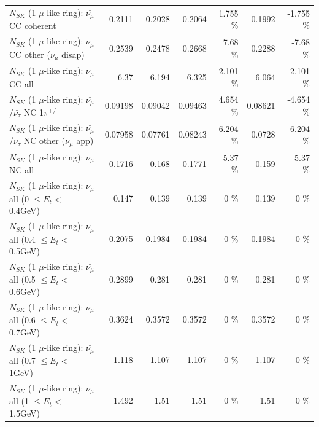 \begin{table}
\begin{tabular}{| l | r | r | r  r | r  r |}
                       $N_{SK}$ (1 $\mu$-like ring): $\bar{\nu_\mu}$ CC coherent &          0.2111 &          0.2028 &          0.2064 &    1.755 \%  &          0.1992 &   -1.755 \%  \\ 
        $N_{SK}$ (1 $\mu$-like ring): $\bar{\nu_\mu}$ CC other ($\nu_\mu$ disap) &          0.2539 &          0.2478 &          0.2668 &     7.68 \%  &          0.2288 &    -7.68 \%  \\ 
                          $N_{SK}$ (1 $\mu$-like ring): $\bar{\nu_{\mu}}$ CC all &            6.37 &           6.194 &           6.325 &    2.101 \%  &           6.064 &   -2.101 \%  \\ 
\hline
  $N_{SK}$ (1 $\mu$-like ring): $\bar{\nu_\mu}$/$\bar{\nu_\tau}$ NC 1$\pi^{+/-}$ &         0.09198 &         0.09042 &         0.09463 &    4.654 \%  &         0.08621 &   -4.654 \%  \\ 
$N_{SK}$ (1 $\mu$-like ring): $\bar{\nu_\mu}$/$\bar{\nu_\tau}$ NC other ($\nu_\mu$ app) &         0.07958 &         0.07761 &         0.08243 &    6.204 \%  &          0.0728 &   -6.204 \%  \\ 
                          $N_{SK}$ (1 $\mu$-like ring): $\bar{\nu_{\mu}}$ NC all &          0.1716 &           0.168 &          0.1771 &     5.37 \%  &           0.159 &    -5.37 \%  \\ 
\hline
   $N_{SK}$ (1 $\mu$-like ring): $\bar{\nu_{\mu}}$ all (0 $\leq E_{t} <$ 0.4GeV) &           0.147 &           0.139 &           0.139 &        0 \%  &           0.139 &        0 \%  \\ 
 $N_{SK}$ (1 $\mu$-like ring): $\bar{\nu_{\mu}}$ all (0.4 $\leq E_{t} <$ 0.5GeV) &          0.2075 &          0.1984 &          0.1984 &        0 \%  &          0.1984 &        0 \%  \\ 
 $N_{SK}$ (1 $\mu$-like ring): $\bar{\nu_{\mu}}$ all (0.5 $\leq E_{t} <$ 0.6GeV) &          0.2899 &           0.281 &           0.281 &        0 \%  &           0.281 &        0 \%  \\ 
 $N_{SK}$ (1 $\mu$-like ring): $\bar{\nu_{\mu}}$ all (0.6 $\leq E_{t} <$ 0.7GeV) &          0.3624 &          0.3572 &          0.3572 &        0 \%  &          0.3572 &        0 \%  \\ 
   $N_{SK}$ (1 $\mu$-like ring): $\bar{\nu_{\mu}}$ all (0.7 $\leq E_{t} <$ 1GeV) &           1.118 &           1.107 &           1.107 &        0 \%  &           1.107 &        0 \%  \\ 
   $N_{SK}$ (1 $\mu$-like ring): $\bar{\nu_{\mu}}$ all (1 $\leq E_{t} <$ 1.5GeV) &           1.492 &            1.51 &            1.51 &        0 \%  &            1.51 &        0 \%  \\ 

\end{tabular}
\end{table}
